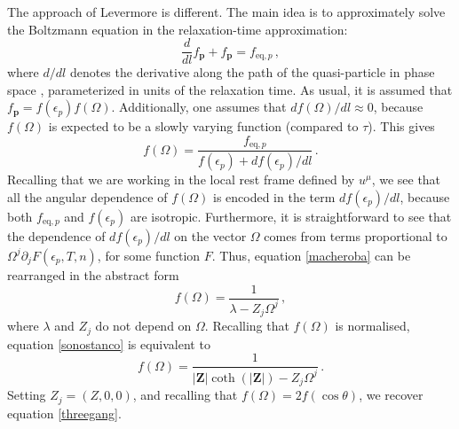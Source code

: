 \documentclass[a4paper, amsfonts, amssymb, amsmath, reprint, showkeys, nofootinbib, twoside, onecolumn, notitlepage]{revtex4-1}
\begin{document}
The approach of Levermore \cite{Levermore1979,Levermore1981} is different. The main idea is to approximately solve the Boltzmann equation in the relaxation-time approximation:
\begin{equation}
   \dfrac{d}{d l} f_{\textbf{p}} +f_{\textbf{p}}=f_{\text{eq},p} \, , 
\end{equation}
where $d/dl$ denotes the derivative along the path of the quasi-particle in phase space \cite{landau10}, parameterized in units of the relaxation time. As usual, it is assumed that $f_{\textbf{p}}=f(\epsilon_p)f(\Omega)$. Additionally, one assumes that $df(\Omega)/dl \approx 0$, because $f(\Omega)$ is expected to be a slowly varying function (compared to $\tau$). This gives
\begin{equation}\label{macheroba}
    f(\Omega) = \dfrac{f_{\text{eq},p}}{f(\epsilon_p)+df(\epsilon_p)/dl} \, .
\end{equation}
Recalling that we are working in the local rest frame defined by $u^\mu$, we see that all the angular dependence of $f(\Omega)$ is encoded in the term $df(\epsilon_p)/dl$, because both $f_{\text{eq},p}$ and $f(\epsilon_p)$ are isotropic. Furthermore, it is straightforward to see that the dependence of $df(\epsilon_p)/dl$ on the vector $\Omega$ comes from terms proportional to $\Omega^j \partial_j F(\epsilon_p,T,n)$, for some function $F$. Thus, equation \eqref{macheroba} can be rearranged in the abstract form
\begin{equation}\label{sonostanco}
    f(\Omega) = \dfrac{1}{\lambda-Z_j \Omega^j} \, ,
\end{equation}
where $\lambda$ and $Z_j$ do not depend on $\Omega$. Recalling that $f(\Omega)$ is normalised, equation \eqref{sonostanco} is equivalent to
\begin{equation}
    f(\Omega)= \dfrac{1}{|\textbf{Z}|\coth(|\textbf{Z}|)-Z_j \Omega^j} \, .
\end{equation}
Setting $Z_j=(Z,0,0)$, and recalling that $f(\Omega)=2f(\cos \theta)$, we recover equation \eqref{threegang}.






\label{lastpage}
\end{document}
